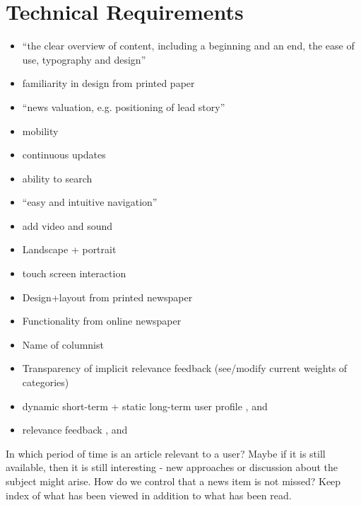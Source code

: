 \section{Technical Requirements}
\begin{itemize}
	\item ``the clear overview of content, including a beginning and an end, the ease of use, typography and design'' \cite[p. 7]{FULLTEXT01.pdf}
	\item familiarity in design from printed paper \cite[p. 7]{FULLTEXT01.pdf}
	\item  ``news valuation, e.g. positioning of lead story'' \cite[p. 7]{FULLTEXT01.pdf}
	\item  mobility \cite[p. 7]{FULLTEXT01.pdf}
	\item  continuous updates \cite[p. 7]{FULLTEXT01.pdf}
	\item  ability to search \cite[p. 7]{FULLTEXT01.pdf}
	\item  ``easy and intuitive navigation'' \cite[p. 7]{FULLTEXT01.pdf}
	\item add video and sound \cite[p. 7]{FULLTEXT01.pdf}
	\item Landscape + portrait \cite[p. 6-7]{kristin_fredrik.pdf}
	\item touch screen interaction \cite[p. 6-7]{kristin_fredrik.pdf}
	\item Design+layout from printed newspaper \cite{hcii2005_1004.pdf}
	\item Functionality from online newspaper \cite{hcii2005_1004.pdf}
	\item Name of columnist \cite[p. 4]{gervasum2001ws.pdf}
	\item Transparency of implicit relevance feedback (see/modify current weights of categories) \cite[p. 7]{gervasum2001ws.pdf}
	\item dynamic short-term + static long-term user profile \cite{10-1-1-19-5583}, \cite{fulltext.pdf} and \cite{gervasum2001ws.pdf}
	\item relevance feedback \cite{10-1-1-19-5583}, \cite{fulltext.pdf} and \cite{gervasum2001ws.pdf}
\end{itemize}

In which period of time is an article relevant to a user? Maybe if it is still available, then it is still interesting - new approaches or discussion about the subject might arise. How do we control that a news item is not missed? Keep index of what has been viewed in addition to what has been read.